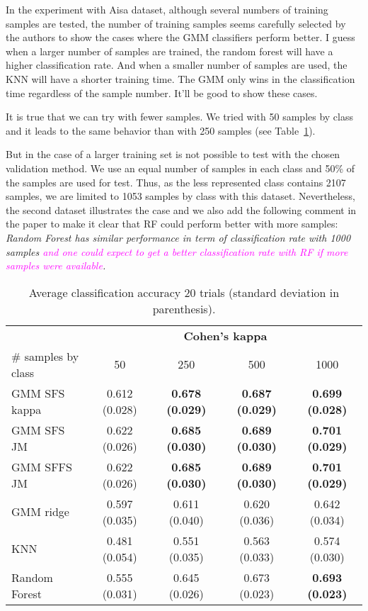 \documentclass[a4paper,10pt,DIV=16]{scrartcl}
\newcommand{\rev}[1]{\textcolor{magenta}{#1}}
\begin{document}
\begin{revbox}
  In the experiment with Aisa dataset, although several numbers of training samples are tested, the number of training samples seems carefully selected by the authors to show the cases where the GMM classifiers perform better. I guess when a larger number of samples are trained, the random forest will have a higher classification rate. And when a smaller number of samples are used, the KNN will have a shorter training time. The GMM only wins in the classification time regardless of the sample number. It’ll be good to show these cases.
  \begin{resbox}
    It is true that we can try with fewer samples. We tried with 50 samples by class and it leads to the same behavior than with 250 samples (see Table~\ref{tab:aisa-otbsimu}).

    But in the case of a larger training set is not possible to test with the chosen validation method. We use an equal number of samples in each class and 50\% of the samples are used for test. Thus, as the less represented class contains 2107 samples, we are limited to 1053 samples by class with this dataset. Nevertheless, the second dataset illustrates the case and we also add the following comment in the paper to make it clear that RF could perform better with more samples:
    \emph{Random Forest has similar performance in term of classification rate with 1000 samples \rev{ and one could expect to get a better classification rate with RF if more samples were available}.}
  \end{resbox}
\end{revbox}

\begin{table}[!t]
    \centering
    \caption{Average classification accuracy 20 trials (standard deviation in parenthesis).\label{tab:aisa-otbsimu}}
    \begin{tabular}{lcccc}\toprule
         & \multicolumn{4}{c}{\bfseries Cohen's kappa} \\ \cmidrule{2-5}
        \# samples by class & 50 & 250 & 500 & 1000 \\ \midrule

        GMM SFS kappa &  0.612 (0.028) & {\bfseries 0.678 (0.029)} & {\bfseries 0.687 (0.029)} & {\bfseries 0.699 (0.028)} \\
        GMM SFS JM &     0.622 (0.026) & {\bfseries 0.685 (0.030)} & {\bfseries 0.689 (0.030)} & {\bfseries 0.701 (0.029)} \\
        GMM SFFS JM &    0.622 (0.026) & {\bfseries 0.685 (0.030)} & {\bfseries 0.689 (0.030)} & {\bfseries 0.701 (0.029)} \\
        GMM ridge &      0.597 (0.035) & 0.611 (0.040) & 0.620 (0.036) & 0.642 (0.034) \\
        KNN &            0.481 (0.054) & 0.551 (0.035) & 0.563 (0.033) & 0.574 (0.030) \\
        Random Forest &  0.555 (0.031) & 0.645 (0.026) & 0.673 (0.023) & {\bfseries 0.693 (0.023)} \\
        \bottomrule
    \end{tabular}
\end{table}
\end{document}
